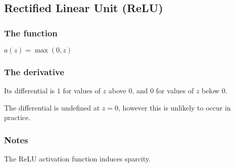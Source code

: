 
\subsection{Rectified Linear Unit (ReLU)}

\subsubsection{The function}

\(a(z)=\max (0,z)\)

\subsubsection{The derivative}

Its differential is \(1\) for values of \(z\) above \(0\), and \(0\) for values of \(z\) below \(0\).

The differential is undefined at \(z=0\), however this is unlikely to occur in practice.

\subsubsection{Notes}

The ReLU activation function induces sparcity.

